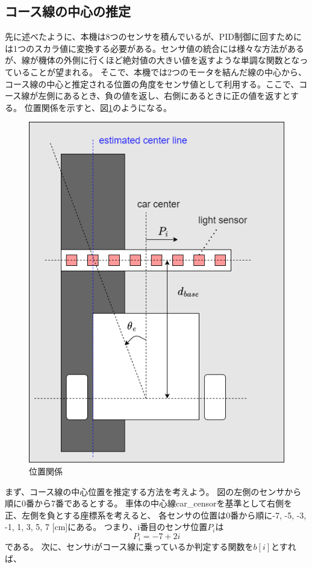 \documentclass{ltjsreport}
\begin{document}
\subsection{コース線の中心の推定}
先に述べたように、本機は8つのセンサを積んでいるが、PID制御に回すためには1つのスカラ値に変換する必要がある。センサ値の統合には様々な方法があるが、線が機体の外側に行くほど絶対値の大きい値を返すような単調な関数となっていることが望まれる。
そこで、本機では2つのモータを結んだ線の中心から、コース線の中心と推定される位置の角度をセンサ値として利用する。ここで、コース線が左側にあるとき、負の値を返し、右側にあるときに正の値を返すとする。
位置関係を示すと、図\ref{fig:linepos}のようになる。
\begin{figure}[H]
  \centering
  \includegraphics[keepaspectratio, scale=0.5]
       {img/sensor_theta.drawio.png}
  \caption{位置関係}
  \label{fig:linepos}
 \end{figure}


まず、コース線の中心位置を推定する方法を考えよう。
図の左側のセンサから順に0番から7番であるとする。
車体の中心線car\_censorを基準として右側を正、左側を負とする座標系を考えると、
各センサの位置は0番から順に-7, -5, -3, -1, 1, 3, 5, 7 [cm]にある。
つまり、i番目のセンサ位置$P_i$は
\[ 
      P_i = -7 + 2i
\]
である。
次に、センサiがコース線に乗っているか判定する関数を$b[i]$とすれば、
\end{document}
